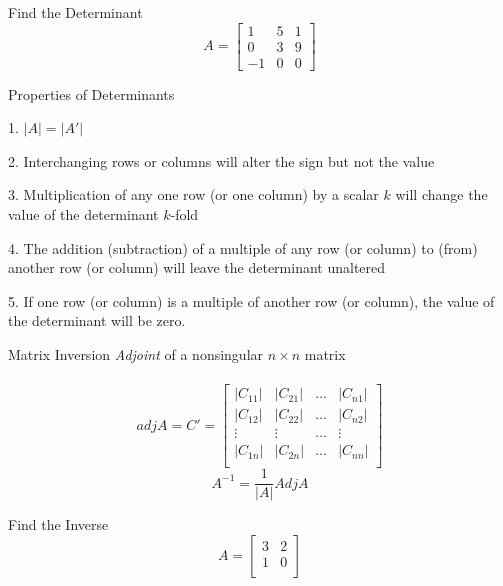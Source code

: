 \documentclass{./../../Latex/teaching_slides}
\begin{document}
\begin{frame}{Find the Determinant}
\[
A=\left[\begin{array}{ccc}
1 & 5 & 1 \\
0 & 3 & 9 \\
-1 & 0 & 0
\end{array}\right]
\]
 \end{frame}


 
\begin{frame}{Properties of Determinants}
\vspace{-0.5em}
\begin{witemize}
\item[1.] $ |A| = |A'|$ 
\item[2.] Interchanging rows or columns will alter the sign but not the value
\item[3.] Multiplication of any one row (or one column) by a scalar $k$ will change the value of the determinant $k$-fold
\item[4.] The addition (subtraction) of a multiple of any row (or column) to (from) another row (or column) will leave the determinant unaltered
\item[5.] If one row (or column) is a multiple of another row (or column), the value of the determinant will be zero. 
\end{witemize}
 \end{frame}
 
\begin{frame}{Matrix Inversion}
 \textit{Adjoint} of a nonsingular $n \times n$ matrix \\~\\
 $$adj A = C' = \left[\begin{array}{llll}
|C_{11}| & |C_{21}| & \hdots & |C_{n1}| \\
|C_{12}| & |C_{22}| & \hdots &  |C_{n2}| \\
\vdots &\vdots & \hdots &  \vdots \\
|C_{1n}| & |C_{2n}| & \hdots & |C_{nn}| \\
\end{array}\right]$$
\vspace{1em}
$$ A^{-1} = \frac{1}{|A|} Adj A$$
 \end{frame}

\begin{frame}{Find the Inverse}
$$
A=\left[\begin{array}{ccc}
3 & 2 \\
1 & 0 \\
\end{array}\right]
$$
 \end{frame}
\end{document}
